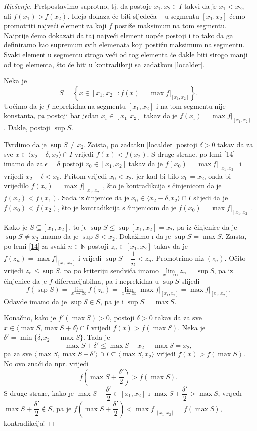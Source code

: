 \begin{proof}[Rješenje]
Pretpostavimo suprotno, tj. da postoje \(x_1, x_2\in I\) takvi da je \(x_1<x_2\), ali \(f(x_1)>f(x_2)\). Ideja dokaza će biti sljedeća -- u segmentu \([x_1, x_2]\) ćemo promotriti najveći element za koji \(f\) postiže maksimum na tom segmentu. Najprije ćemo dokazati da taj najveći element uopće postoji i to tako da ga definiramo kao supremum svih elemenata koji postižu maksimum na segmentu. Svaki element u segmentu strogo veći od tog elementa će dakle biti strogo manji od tog elementa, što će biti u kontradikciji sa zadatkom \ref{localder}.

Neka je 
\[S=\left\{x\in [x_1, x_2] : f(x)=\max{f|_{[x_1, x_2]}}\right\}.\] 
Uočimo da je \(f\) neprekidna na segmentu \([x_1, x_2]\) i na tom segmentu nije konstanta, pa postoji bar jedan \(x_i\in [x_1, x_2]\) takav da je \(f(x_i)=\max{f|_{[x_1, x_2]}}\). Dakle, postoji \(\sup{S}\).

Tvrdimo da je \(\sup{S}\neq x_2\). Zaista, po zadatku \ref{localder} postoji \(\delta>0\) takav da za sve \(x\in \langle x_2-\delta, x_2\rangle\cap I\) vrijedi \(f(x)<f(x_2)\). S druge strane, po lemi \ref{14} imamo da za \(\epsilon=\delta\) postoji \(x_0\in [x_1, x_2]\) takav da je \(f(x_0)=\max{f|_{[x_1, x_2]}}\) i vrijedi \(x_2-\delta<x_0\). Pritom vrijedi \(x_0<x_2\), jer kad bi bilo \(x_0=x_2\), onda bi vrijedilo \(f(x_2)=\max{f|_{[x_1, x_2]}}\), što je kontradikcija s činjenicom da je \(f(x_2)<f(x_1)\). Sada iz činjenice da je \(x_0\in \langle x_2-\delta, x_2\rangle\cap I\) slijedi da je \(f(x_0)<f(x_2)\), što je kontradikcija s činjenicom da je \(f(x_0)=\max{f|_{[x_1, x_2]}}\).

Kako je \(S\subseteq [x_1, x_2]\), to je \(\sup{S}\leq \sup{[x_1, x_2]}=x_2\), pa iz činjenice da je \(\sup{S}\neq x_2\) imamo da je \(\sup{S}<x_2\). Dokažimo i da je
\(\sup{S}=\max{S}.\)
Zaista, po lemi \ref{14} za svaki \(n\in \mathbb{N}\) postoji \(z_n\in [x_1, x_2]\) takav da je \(f(z_n)=\max{f|_{[x_1, x_2]}}\) i vrijedi \(\sup{S}-\dfrac{1}{n}<z_n\). Promotrimo niz \((z_n)\). Očito vrijedi \(z_n\leq \sup{S}\), pa po kriteriju sendviča imamo \(\lim\limits_{x\to\infty}{z_n}=\sup{S}\), pa iz činjenice da je \(f\) diferencijabilna, pa i neprekidna u \(\sup{S}\) slijedi
\[f(\sup{S})=\lim\limits_{x\to\infty}{f(z_n)}=\lim\limits_{x\to\infty}{\max{f|_{[x_1, x_2]}}}=\max{f|_{[x_1, x_2]}}.\]
Odavde imamo da je \(\sup{S}\in S\), pa je i \(\sup{S}=\max{S}\).

Konačno, kako je \(f'(\max{S})>0\), postoji \(\delta>0\) takav da za sve \(x\in \langle \max{S}, \max{S}+\delta\rangle\cap I\) vrijedi \(f(x)>f(\max{S})\). Neka je \(\delta'=\min\{\delta, x_2-\max{S}\}\). Tada je 
\[\max{S}+\delta'\leq \max{S}+x_2-\max{S}=x_2,\]
pa za sve \(\langle \max{S}, \max{S}+\delta'\rangle\cap I\subseteq \langle \max{S}, x_2\rangle\) vrijedi \(f(x)>f(\max{S})\). No ovo znači da npr. vrijedi \[f\left(\max{S}+\dfrac{\delta'}{2}\right)>f(\max{S}).\] S druge strane, kako je \(\max{S}+\dfrac{\delta'}{2}\in [x_1, x_2]\) i \(\max{S}+\dfrac{\delta'}{2}>\max{S}\), vrijedi \(\max{S}+\dfrac{\delta'}{2}\notin S\),
pa je \(f\left(\max{S}+\dfrac{\delta'}{2}\right)<\max{f|_{[x_1, x_2]}}=f(\max{S})\), kontradikcija!
\end{proof}

